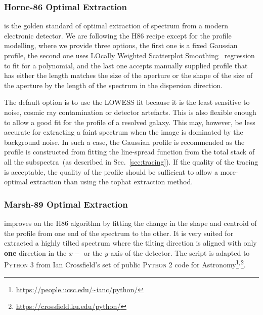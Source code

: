 \documentclass[fleqn,usenatbib]{mnras}
\begin{document}
\subsubsection*{Horne-86 Optimal Extraction}
\citet[hereafter H86]{1986PASP...98..609H} is the golden standard
of optimal extraction of spectrum from a modern electronic detector.
We are following the H86 recipe except for the profile modelling,
where we provide three options, the first one is a fixed Gaussian
profile, the second one uses LOcally Weighted Scatterplot
Smoothing~\citep[LOWESS]{doi:10.1080/01621459.1979.10481038}
regression to fit for a polynomial, and the last one accepts
manually supplied profile that has either the length matches the
size of the aperture or the shape of the size of the aperture by
the length of the spectrum in the dispersion direction.

The default option is to use the LOWESS fit because it is the
least sensitive to noise, cosmic ray contamination or detector
artefacts. This is also flexible enough to allow a good fit for
the profile of a resolved galaxy. This may, however, be less
accurate for extracting a faint spectrum when the image is
dominated by the background noise. In such a case, the Gaussian
profile is recommended as the profile is constructed from fitting
the line-spread function from the total stack of all the
subspectra~(as described in Sec.~\ref{sec:tracing}). If
the quality of the tracing is acceptable, the quality of the
profile should be sufficient to allow a more-optimal extraction
than using the tophat extraction method.

\subsubsection*{Marsh-89 Optimal Extraction}
\citet[hereafter M89]{1989PASP..101.1032M} improves on the H86
algorithm by fitting the change in the shape and centroid of
the profile from one end of the spectrum to the other. It is
very suited for extracted a highly tilted spectrum where the
tilting direction is aligned with only \textbf{one} direction
in the $x-$ or the $y$-axis of the detector. The script is
adapted to \textsc{Python 3} from Ian Crossfield's set of public
\textsc{Python 2} code for Astronomy\footnote{\url{https://people.ucsc.edu/~ianc/python/}}$^,$\footnote{\url{https://crossfield.ku.edu/python/}}.
\end{document}
